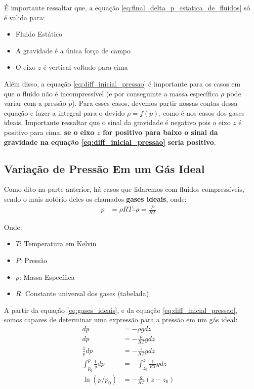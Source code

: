 \documentclass{article}
\newcommand{\n}{\nonumber \\ }
\begin{document}
            É importante ressaltar que, a equação \ref{eq:final_delta_p_estatica_de_fluidos} só é valida para:
            \begin{itemize}
                \item Fluido Estático
                \item A gravidade é a única força de campo
                \item O eixo $z$ é vertical voltado para cima
            \end{itemize}

            Além disso, a equação \ref{eq:diff_inicial_pressao} é importante para os casos em que o fluido não é incompressível (e por conseguinte a massa específica $\rho$ pode variar com a pressão
            $p$). Para esses casos, devemos partir nossas contas dessa equação e fazer a integral para o devido $\rho = f(p)$, como é nos casos dos gases ideais. Importante ressaltar que o sinal da
            gravidade é negativo pois o eixo $z$ é positivo para cima, \textbf{se o eixo $z$ for positivo para baixo o sinal da gravidade na equação \ref{eq:diff_inicial_pressao} seria positivo}.


            \newpage

        \subsection{Variação de Pressão Em um Gás Ideal}
            Como dito na parte anterior, há casos que lidaremos com fluidos compressíveis, sendo o mais notório deles os chamados \textbf{gases ideais}, onde:
            \begin{align}
                p &= \rho RT \therefore \rho = \frac{P}{RT} \label{eq:gases_ideais}
            \end{align}

            Onde: 
            \begin{itemize}
                \item $T$: Temperatura em Kelvin
                \item $P$: Pressão
                \item $\rho$: Massa Específica
                \item $R$: Constante universal dos gases (tabelada)
            \end{itemize}

            A partir da equação \ref{eq:gases_ideais}, e da equação \ref{eq:diff_inicial_pressao}, somos capazes de determinar uma expressão para a pressão em um gás ideal:
            \begin{align}
                dp &= - \rho g dz \n
                dp &= - \frac{p}{RT} g dz \n
                \frac{1}{p} dp &= -\frac{1}{RT} g dz \n
                \int^p_{p_0}\frac{1}{p} dp &= -\int^z_{z_0}\frac{1}{RT} g dz \n
                \ln{(p/p_0)} &= -\frac{g}{RT} (z - z_0)
            \end{align}
\end{document}
